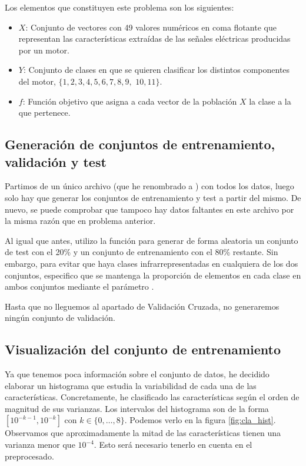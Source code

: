 \documentclass[10pt,a4paper]{article}
\begin{document}
Los elementos que constituyen este problema son los siguientes:

\begin{itemize}
	\item $X$: Conjunto de vectores con 49 valores numéricos en coma flotante que representan las características extraídas de las señales eléctricas producidas por un motor.
	\item $Y$: Conjunto de clases en que se quieren clasificar los distintos componentes del motor, $\{1,2,3,4,5,6,7,8,9,$ $10,11\}$.
	\item $f$: Función objetivo que asigna a cada vector de la población $X$ la clase a la que pertenece.
\end{itemize}






\subsection{Generación de conjuntos de entrenamiento, validación y test}

Partimos de un único archivo  (que he renombrado a ) con todos los datos, luego solo hay que generar los conjuntos de entrenamiento y test a partir del mismo. De nuevo, se puede comprobar que tampoco hay datos faltantes en este archivo por la misma razón que en problema anterior.

Al igual que antes, utilizo la función  para generar de forma aleatoria un conjunto de test con el 20\% y un conjunto de entrenamiento con el 80\% restante. Sin embargo, para evitar que haya clases infrarrepresentadas en cualquiera de los dos conjuntos, especifico que se mantenga la proporción de elementos en cada clase en ambos conjuntos mediante el parámetro .

Hasta que no lleguemos al apartado de Validación Cruzada, no generaremos ningún conjunto de validación.





\subsection{Visualización del conjunto de entrenamiento}

Ya que tenemos poca información sobre el conjunto de datos, he decidido elaborar un histograma que estudia la variabilidad de cada una de las características. Concretamente, he clasificado las características según el orden de magnitud de sus varianzas. Los intervalos del histograma son de la forma $[10^{-k-1},10^{-k}]$ con $k \in \{0,\dots,8\}$. Podemos verlo en la figura \ref{fig:cla_hist}. Observamos que aproximadamente la mitad de las características tienen una varianza menor que $10^{-4}$. Esto será necesario tenerlo en cuenta en el preprocesado.
\end{document}
